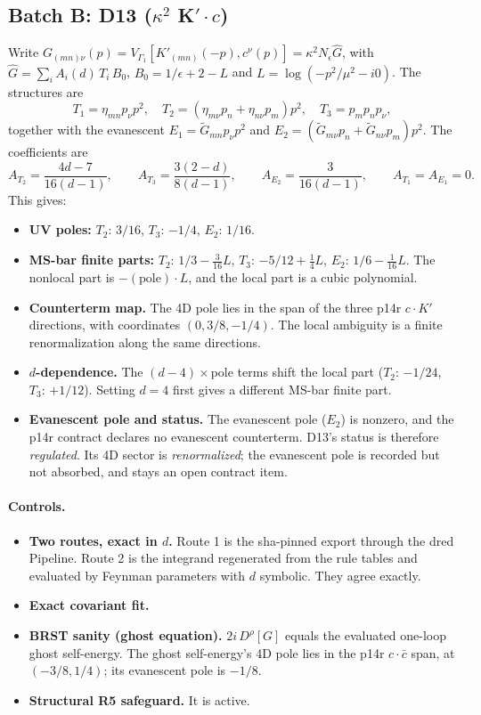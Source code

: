 \subsection{Batch B: D13 ($\kappa^2$ K$'\!\cdot c$)}
Write $G_{(mn)\nu}(p)=V_{\Gamma_1}[K'_{(mn)}(-p),c^\nu(p)]=\kappa^2N_\epsilon\hat G$, with
$\hat G=\sum_iA_i(d)\,T_i\,B_0$, $B_0=1/\epsilon+2-L$ and $L=\log(-p^2/\mu^2-i0)$. The structures are
\[
T_1=\eta_{mn}p_\nu p^2,\quad T_2=(\eta_{m\nu}p_n+\eta_{n\nu}p_m)p^2,\quad T_3=p_mp_np_\nu,
\]
together with the evanescent $E_1=\tilde G_{mn}p_\nu p^2$ and $E_2=(\tilde G_{m\nu}p_n+\tilde G_{n\nu}p_m)p^2$. The
coefficients are
\[
A_{T_2}=\frac{4d-7}{16(d-1)},\qquad A_{T_3}=\frac{3(2-d)}{8(d-1)},\qquad A_{E_2}=\frac{3}{16(d-1)},\qquad
A_{T_1}=A_{E_1}=0 .
\]
This gives:
\begin{itemize}
\item \textbf{UV poles:} $T_2$: $3/16$, $T_3$: $-1/4$, $E_2$: $1/16$.
\item \textbf{MS-bar finite parts:} $T_2$: $1/3-\tfrac{3}{16}L$, $T_3$: $-5/12+\tfrac14L$, $E_2$: $1/6-\tfrac1{16}L$.
The nonlocal part is $-(\text{pole})\cdot L$, and the local part is a cubic polynomial.
\item \textbf{Counterterm map.} The 4D pole lies in the span of the three p14r $c\cdot K'$ directions, with coordinates
$(0,3/8,-1/4)$. The local ambiguity is a finite renormalization along the same directions.
\item \textbf{$d$-dependence.} The $(d-4)\times$pole terms shift the local part ($T_2$: $-1/24$, $T_3$: $+1/12$).
Setting $d=4$ first gives a different MS-bar finite part.
\item \textbf{Evanescent pole and status.} The evanescent pole ($E_2$) is nonzero, and the p14r contract declares no
evanescent counterterm. D13's status is therefore \emph{regulated}. Its 4D sector is \emph{renormalized}; the
evanescent pole is recorded but not absorbed, and stays an open contract item.
\end{itemize}

\paragraph{Controls.}
\begin{itemize}
\item \textbf{Two routes, exact in $d$.} Route 1 is the sha-pinned export through the dred Pipeline. Route 2 is the
integrand regenerated from the rule tables and evaluated by Feynman parameters with $d$ symbolic. They agree exactly.
\item \textbf{Exact covariant fit.}
\item \textbf{BRST sanity (ghost equation).} $2i\,D^\rho[G]$ equals the evaluated one-loop ghost self-energy. The
ghost self-energy's 4D pole lies in the p14r $c\cdot\bar c$ span, at $(-3/8,1/4)$; its evanescent pole is $-1/8$.
\item \textbf{Structural R5 safeguard.} It is active.
\end{itemize}
